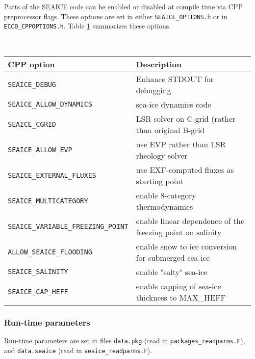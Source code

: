 Parts of the SEAICE code can be enabled or disabled at compile time
via CPP preprocessor flags. These options are set in either
\texttt{SEAICE\_OPTIONS.h} or in \texttt{ECCO\_CPPOPTIONS.h}.
Table \ref{tab:pkg:seaice:cpp} summarizes these options.

\begin{table}[h!]
\centering
  \label{tab:pkg:seaice:cpp}
  {\footnotesize
    \begin{tabular}{|l|l|}
      \hline 
      \textbf{CPP option}  &  \textbf{Description}  \\
      \hline \hline
        \texttt{SEAICE\_DEBUG} & 
          Enhance STDOUT for debugging \\
        \texttt{SEAICE\_ALLOW\_DYNAMICS} & 
          sea-ice dynamics code \\
        \texttt{SEAICE\_CGRID} & 
          LSR solver on C-grid (rather than original B-grid \\
        \texttt{SEAICE\_ALLOW\_EVP} & 
          use EVP rather than LSR rheology solver \\
        \texttt{SEAICE\_EXTERNAL\_FLUXES} & 
          use EXF-computed fluxes as starting point \\
        \texttt{SEAICE\_MULTICATEGORY} & 
          enable 8-category thermodynamics \\
        \texttt{SEAICE\_VARIABLE\_FREEZING\_POINT} & 
          enable linear dependence of the freezing point on salinity \\
        \texttt{ALLOW\_SEAICE\_FLOODING} & 
          enable snow to ice conversion for submerged sea-ice \\
        \texttt{SEAICE\_SALINITY} & 
          enable "salty" sea-ice \\
        \texttt{SEAICE\_CAP\_HEFF} & 
          enable capping of sea-ice thickness to MAX\_HEFF \\
      \hline
    \end{tabular}
  }
  \caption{~}
\end{table}


\subsubsection{Run-time parameters
\label{sec:pkg:seaice:runtime}}

Run-time parameters are set in files 
\texttt{data.pkg} (read in \texttt{packages\_readparms.F}),
and \texttt{data.seaice} (read in \texttt{seaice\_readparms.F}).

